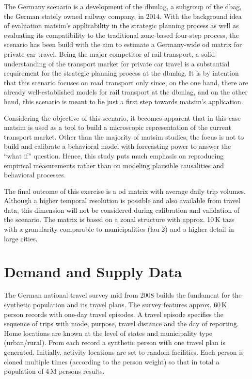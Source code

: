The Germany scenario is a development of the \gls{dbmlag}, a subgroup of the \gls{dbag}, the German stately owned railway company, in 2014. With the background idea of evaluation \gls{matsim}'s applicability in the strategic planning process as well as evaluating its compatibility to the traditional zone-based four-step process, the scenario has been build with the aim to estimate a Germany-wide \gls{od} matrix for private car travel. Being the major competitor of rail transport, a solid understanding of the transport market for private car travel is a substantial requirement for the strategic planning process at the \gls{dbmlag}. It is by intention that this scenario focuses on road transport only since, on the one hand, there are already well-established models for rail transport at the \gls{dbmlag}, and on the other hand, this scenario is meant to be just a first step towards \gls{matsim}'s application.

Considering the objective of this scenario, it becomes apparent that in this case \gls{matsim} is used as a tool to build a microscopic representation of the current transport market. Other than the majority of \gls{matsim} studies, the focus is not to build and calibrate a behavioral model with forecasting power to answer the ``what if'' question. Hence, this study puts much emphasis on reproducing empirical measurements rather than on modeling plausible causalities and behavioral processes.

The final outcome of this exercise is a \gls{od} matrix with average daily trip volumes. Although a higher temporal resolution is possible and also available from travel data, this dimension will not be considered during calibration and validation of the scenario. The matrix is based on a zonal structure with approx. 10\,K \glspl{taz} with a granularity comparable to municipalities (\gls{lau} 2) and a higher detail in large cities.

\section{Demand and Supply Data}

The German national travel survey \gls{mid} from 2008 \citep{Follmer2010MiD} builds the fundament for the synthetic population and its travel plans. The survey features approx. 60\,K person records with one-day travel episodes. A travel episode specifies the sequence of trips with mode, purpose, travel distance and the day of reporting. Home locations are known at the level of states and municipality type (urban/rural). From each record a synthetic person with one travel plan is generated. Initially, activity locations are set to random facilities. Each person is cloned multiple times (according to the person weight) so that in total a population of 4\,M persons results.

